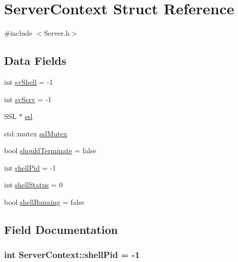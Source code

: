 \hypertarget{structServerContext}{}\section{Server\+Context Struct Reference}
\label{structServerContext}


{\ttfamily \#include $<$Server.\+h$>$}

\subsection*{Data Fields}
\begin{DoxyCompactItemize}
\item 
int \hyperlink{structServerContext_a2d08d74a2daaedabbcce115bdf8f05fa}{sv\+Shell} = -\/1
\item 
int \hyperlink{structServerContext_a728b751fab25a3042eb9e6b668bc9fb3}{sv\+Serv} = -\/1
\item 
S\+SL $\ast$ \hyperlink{structServerContext_a8ae67e20dfa22be8e22d03e7ea195113}{ssl}
\item 
std\+::mutex \hyperlink{structServerContext_adaf5a8ecb1b63b5dd2b932260fb99145}{ssl\+Mutex}
\item 
bool \hyperlink{structServerContext_a66fa302afc00b08a437e23858d5c371f}{should\+Terminate} = false
\item 
int \hyperlink{structServerContext_a74d22304cd75cb80b3899507c83e3941}{shell\+Pid} = -\/1
\item 
int \hyperlink{structServerContext_a5704a178d3f70e1b514b8fb9d21c8a42}{shell\+Status} = 0
\item 
bool \hyperlink{structServerContext_ad0a0299ad274c033c44da46a775d8702}{shell\+Running} = false
\end{DoxyCompactItemize}


\subsection{Field Documentation}
\subsubsection[{\texorpdfstring{shell\+Pid}{shellPid}}]{\setlength{\rightskip}{0pt plus 5cm}int Server\+Context\+::shell\+Pid = -\/1}\hypertarget{structServerContext_a74d22304cd75cb80b3899507c83e3941}{}\label{structServerContext_a74d22304cd75cb80b3899507c83e3941}
